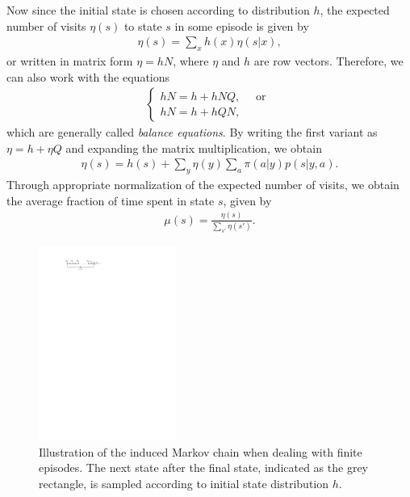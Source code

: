 \documentclass[a4paper]{article}
\begin{document}
%
Now since the initial state is chosen according to distribution $h$, the
expected number of visits $\eta(s)$ to state $s$ in some episode is given by
\begin{align*}
  \eta(s) = \sum_{x} h(x) \eta(s | x) ,
\end{align*}
or written in matrix form $\eta = hN$, where $\eta$ and $h$ are row vectors.
%
Therefore, we can also work with the equations
\begin{align*}
  \begin{cases}
  hN = h + hNQ , \quad \text{ or } \\
  hN = h + hQN ,
  \end{cases}
\end{align*}
which are generally called \textit{balance equations}.
By writing the first variant as $\eta = h + \eta Q$ and expanding the matrix
multiplication, we obtain
\begin{align*}
  \eta(s) = h(s) + \sum_{y} \eta(y) \sum_{a} \pi(a|y)p(s|y,a) .
\end{align*}
%
Through appropriate normalization of the expected number of visits, we obtain
the average fraction of time spent in state $s$, given by
\begin{align*}
  \mu(s) = \frac{\eta(s)}{\sum_{s'} \eta(s')} .
\end{align*}

\begin{figure}
  \centering
  \includegraphics[width=0.4\textwidth]{figures/episodic_markov_chain.pdf}
  \caption{Illustration of the induced Markov chain when dealing with finite
    episodes. The next state after the final state, indicated as the grey
    rectangle, is sampled according to initial state distribution $h$.}
  \label{fig:episodic_MC}
\end{figure}
\end{document}
